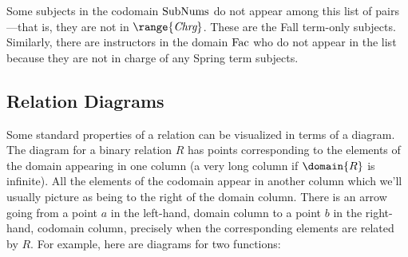 \iffalse
This is a surprisingly complicated relation: Meyer is in charge of
subjects with three numbers.  Leighton is also in charge of subjects with
two of these three numbers---because the same subject, Mathematics for
Computer Science, has two numbers: 6.042 and 18.062, and Meyer and
Leighton are co-in-charge of the subject.  Freeman is in-charge of even
more subjects numbers (around 20), since as Department Education Officer,
he is in charge of whole blocks of special subject numbers.  Some
subjects, like 6.844 and 6.00 have only one person in-charge.  Some
faculty, like Guttag, are in charge of only one subject number, and no one
else is co-in-charge of his subject, 6.00.
\fi

Some subjects in the codomain $\text{SubNums}$ do not appear among this
list of pairs---that is, they are not in $\range{\inchrg}$.  These are
the Fall term-only subjects.  Similarly, there are instructors in the
domain $\text{Fac}$ who do not appear in the list because they are not
in charge of any Spring term subjects.

\subsection{Relation Diagrams}\label{leq1in_sec}
Some standard properties of a relation can be visualized in terms of a
diagram.  The diagram for a binary relation $R$ has points corresponding
to the elements of the domain appearing in one column (a very long column if
$\domain{R}$ is infinite).  All the elements of the codomain appear in
another column which we'll usually picture as being to the right of the
domain column.  There is an arrow going from a point $a$ in the
left-hand, domain column to a point $b$ in the right-hand, codomain
column, precisely when the corresponding elements are related by $R$.  For
example, here are diagrams for two functions:

